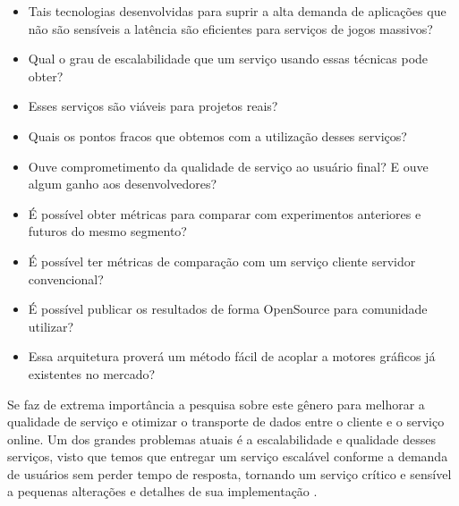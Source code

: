 \begin{itemize}
  \item Tais tecnologias desenvolvidas para suprir a alta demanda de aplicações que não são sensíveis a latência são eficientes para serviços de jogos massivos?
  \item Qual o grau de escalabilidade que um serviço usando essas técnicas pode obter?
  \item Esses serviços são viáveis para projetos reais?
  \item Quais os pontos fracos que obtemos com a utilização desses serviços?
  \item Ouve comprometimento da qualidade de serviço ao usuário final? E ouve algum ganho aos desenvolvedores?
  \item É possível obter métricas para comparar com experimentos anteriores e futuros do mesmo segmento?
  \item É possível ter métricas de comparação com um serviço cliente servidor convencional?
  \item É possível publicar os resultados de forma OpenSource para comunidade utilizar?
  \item Essa arquitetura proverá um método fácil de acoplar a motores gráficos já existentes no mercado?
\end{itemize}

Se faz de extrema importância a pesquisa sobre este gênero para melhorar a qualidade de serviço e otimizar o transporte de dados entre o cliente e o serviço online. Um dos grandes problemas atuais é a escalabilidade e qualidade desses serviços, visto que temos que entregar um serviço escalável conforme a demanda de usuários sem perder tempo de resposta, tornando um serviço crítico e sensível a pequenas alterações e detalhes de sua implementação \cite{cloud_fog}.
